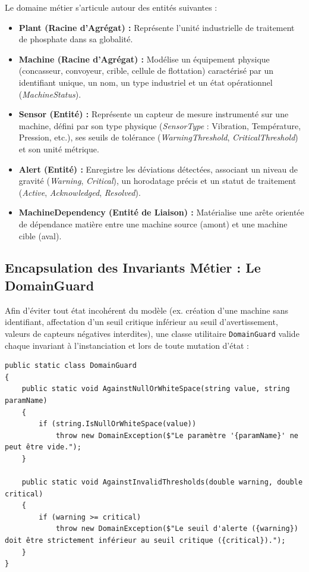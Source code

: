 Le domaine métier s'articule autour des entités suivantes :
\begin{itemize}
    \item \textbf{Plant (Racine d'Agrégat) :} Représente l'unité industrielle de traitement de phosphate dans sa globalité.
    \item \textbf{Machine (Racine d'Agrégat) :} Modélise un équipement physique (concasseur, convoyeur, crible, cellule de flottation) caractérisé par un identifiant unique, un nom, un type industriel et un état opérationnel (\textit{MachineStatus}).
    \item \textbf{Sensor (Entité) :} Représente un capteur de mesure instrumenté sur une machine, défini par son type physique (\textit{SensorType} : Vibration, Température, Pression, etc.), ses seuils de tolérance (\textit{WarningThreshold}, \textit{CriticalThreshold}) et son unité métrique.
    \item \textbf{Alert (Entité) :} Enregistre les déviations détectées, associant un niveau de gravité (\textit{Warning}, \textit{Critical}), un horodatage précis et un statut de traitement (\textit{Active}, \textit{Acknowledged}, \textit{Resolved}).
    \item \textbf{MachineDependency (Entité de Liaison) :} Matérialise une arête orientée de dépendance matière entre une machine source (amont) et une machine cible (aval).
\end{itemize}

\subsection{Encapsulation des Invariants Métier : Le DomainGuard}

Afin d'éviter tout état incohérent du modèle (ex. création d'une machine sans identifiant, affectation d'un seuil critique inférieur au seuil d'avertissement, valeurs de capteurs négatives interdites), une classe utilitaire \texttt{DomainGuard} valide chaque invariant à l'instanciation et lors de toute mutation d'état :

\begin{lstlisting}[language=CSharpCustom, caption={Validation des invariants du domaine par DomainGuard}]
public static class DomainGuard
{
    public static void AgainstNullOrWhiteSpace(string value, string paramName)
    {
        if (string.IsNullOrWhiteSpace(value))
            throw new DomainException($"Le paramètre '{paramName}' ne peut être vide.");
    }

    public static void AgainstInvalidThresholds(double warning, double critical)
    {
        if (warning >= critical)
            throw new DomainException($"Le seuil d'alerte ({warning}) doit être strictement inférieur au seuil critique ({critical}).");
    }
}
\end{lstlisting}

